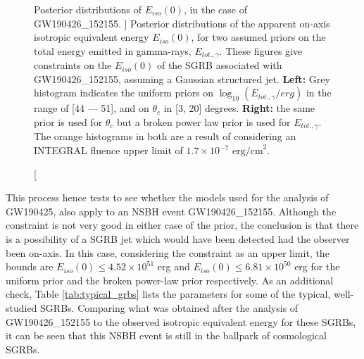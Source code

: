     \begin{figure}[H]
        \begin{subfigure}{0.5\textwidth}
              \label{fig:nsbh_unif}
              \centering
              \def\svgwidth{\textwidth}
              
        \end{subfigure}%
        \begin{subfigure}{0.5\textwidth}
              \label{fig:nsbh_bpl}
              \centering
              \def\svgwidth{\textwidth}
              
        \end{subfigure}
        \caption
        [
            Posterior distributions of $E_{iso}(0)$, in the case of GW190426\_152155.
        ]
        {
            Posterior distributions of the apparent on-axis isotropic equivalent energy
            $E_{iso}(0)$, for two assumed priors on the total energy emitted in
            gamma-rays, $E_{tot., \gamma}$. These figures give constraints on the
            $E_{iso}(0)$ of the SGRB associated with GW190426\_152155, assuming a
            Gaussian structured jet. \textbf{Left:} Grey histogram indicates the uniform
            priors on $\log_{10}(E_{tot., \gamma}/erg)$ in the range of [44 --- 51], and
            on $\theta_c$ in [3, 20] degrees. \textbf{Right:} the same prior is used for
            $\theta_c$ but a broken power law prior is used for $E_{tot., \gamma}$. The
            orange histograms in both are a result of considering an INTEGRAL fluence
            upper limit of $1.7 \times 10^{-7} \text{ erg/cm}^2$.
        }
        \label{fig:nsbh_unif_bpl}
    \end{figure}

    This process hence tests to see whether the models used for the analysis of
    GW190425, also apply to an NSBH event GW190426\_152155. Although the constraint is
    not very good in either case of the prior, the conclusion is that there is a
    possibility of a SGRB jet which would have been detected had the observer been
    on-axis. In this case, considering the constraint as an upper limit, the bounds are
    $E_{iso}(0) \leq 4.52 \times 10^{51}$ erg and $E_{iso}(0) \leq 6.81 \times 10^{50}$
    erg for the uniform prior and the broken power-law prior respectively.  As an
    additional check, Table \ref{tab:typical_grbs} lists the parameters for some of
    the typical, well-studied SGRBs. Comparing what was obtained after the analysis of
    GW190426\_152155 to the observed isotropic equivalent energy for these SGRBs, it can
    be seen that this NSBH event is still in the ballpark of cosmological SGRBs.

